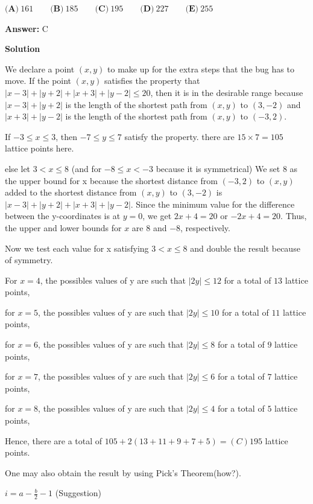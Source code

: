 \begin{enumerate}
 $\textbf{(A)}\ 161 \qquad \textbf{(B)}\ 185 \qquad \textbf{(C)}\  195 \qquad \textbf{(D)}\  227 \qquad \textbf{(E)}\  255$

 \textbf{Answer: }C



\textbf{Solution}

We declare a point $(x, y)$ to make up for the extra steps that the bug has to move. If the point $(x, y)$ satisfies the property that $|x - 3| + |y + 2| + |x + 3| + |y - 2| \le 20$, then it is in the desirable range because $|x - 3| + |y + 2|$ is the length of the shortest path from $(x,y)$ to $(3, -2)$ and $|x + 3| + |y - 2|$ is the length of the shortest path from $(x,y)$ to $(-3, 2)$.

 
If $-3\le x \le 3$, then $-7\le y \le 7$ satisfy the property. there are $15 \times 7 = 105$ lattice points here.

 else let $3< x \le 8$ (and for $-8 \le x < -3$ because it is symmetrical) We set 8 as the upper bound for x because the shortest distance from $(-3, 2)$ to $(x, y)$ added to the shortest distance from $(x, y)$ to $(3, -2)$ is $|x - 3| + |y + 2| + |x + 3| + |y - 2|$. Since the minimum value for the difference between the y-coordinates is at $y = 0$, we get $2x + 4 = 20$ or $-2x + 4 = 20$. Thus, the upper and lower bounds for $x$ are $8$ and $-8$, respectively.

 Now we test each value for x satisfying $3< x \le 8$ and double the result because of symmetry.

 For $x = 4$, the possibles values of y are such that $|2y| \le 12$ for a total of $13$ lattice points,

 for $x = 5$, the possibles values of y are such that $|2y| \le 10$ for a total of $11$ lattice points,

 for $x = 6$, the possibles values of y are such that $|2y| \le 8$ for a total of $9$ lattice points,

 for $x = 7$, the possibles values of y are such that $|2y| \le 6$ for a total of $7$ lattice points,

 for $x = 8$, the possibles values of y are such that $|2y| \le 4$ for a total of $5$ lattice points,


 Hence, there are a total of $105 + 2 ( 13 + 11 + 9 + 7 + 5) = \boxed{(C) 195}$ lattice points.

 One may also obtain the result by using Pick's Theorem(how?).

 $i = a - \frac{b}{2} - 1$ (Suggestion)


\end{enumerate}
